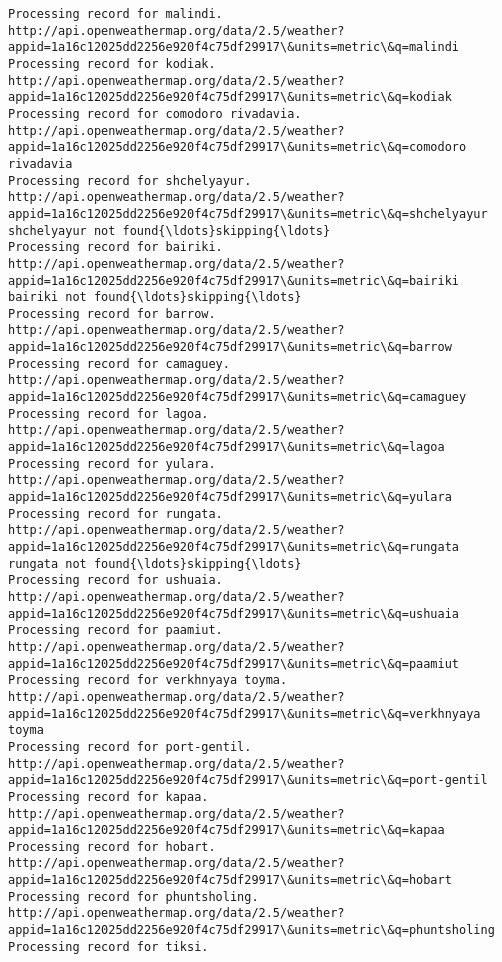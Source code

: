 \documentclass[11pt]{article}
\begin{document}
\begin{Verbatim}[commandchars=\\\{\}]
Processing record for malindi.
http://api.openweathermap.org/data/2.5/weather?appid=1a16c12025dd2256e920f4c75df29917\&units=metric\&q=malindi
Processing record for kodiak.
http://api.openweathermap.org/data/2.5/weather?appid=1a16c12025dd2256e920f4c75df29917\&units=metric\&q=kodiak
Processing record for comodoro rivadavia.
http://api.openweathermap.org/data/2.5/weather?appid=1a16c12025dd2256e920f4c75df29917\&units=metric\&q=comodoro rivadavia
Processing record for shchelyayur.
http://api.openweathermap.org/data/2.5/weather?appid=1a16c12025dd2256e920f4c75df29917\&units=metric\&q=shchelyayur
shchelyayur not found{\ldots}skipping{\ldots}
Processing record for bairiki.
http://api.openweathermap.org/data/2.5/weather?appid=1a16c12025dd2256e920f4c75df29917\&units=metric\&q=bairiki
bairiki not found{\ldots}skipping{\ldots}
Processing record for barrow.
http://api.openweathermap.org/data/2.5/weather?appid=1a16c12025dd2256e920f4c75df29917\&units=metric\&q=barrow
Processing record for camaguey.
http://api.openweathermap.org/data/2.5/weather?appid=1a16c12025dd2256e920f4c75df29917\&units=metric\&q=camaguey
Processing record for lagoa.
http://api.openweathermap.org/data/2.5/weather?appid=1a16c12025dd2256e920f4c75df29917\&units=metric\&q=lagoa
Processing record for yulara.
http://api.openweathermap.org/data/2.5/weather?appid=1a16c12025dd2256e920f4c75df29917\&units=metric\&q=yulara
Processing record for rungata.
http://api.openweathermap.org/data/2.5/weather?appid=1a16c12025dd2256e920f4c75df29917\&units=metric\&q=rungata
rungata not found{\ldots}skipping{\ldots}
Processing record for ushuaia.
http://api.openweathermap.org/data/2.5/weather?appid=1a16c12025dd2256e920f4c75df29917\&units=metric\&q=ushuaia
Processing record for paamiut.
http://api.openweathermap.org/data/2.5/weather?appid=1a16c12025dd2256e920f4c75df29917\&units=metric\&q=paamiut
Processing record for verkhnyaya toyma.
http://api.openweathermap.org/data/2.5/weather?appid=1a16c12025dd2256e920f4c75df29917\&units=metric\&q=verkhnyaya toyma
Processing record for port-gentil.
http://api.openweathermap.org/data/2.5/weather?appid=1a16c12025dd2256e920f4c75df29917\&units=metric\&q=port-gentil
Processing record for kapaa.
http://api.openweathermap.org/data/2.5/weather?appid=1a16c12025dd2256e920f4c75df29917\&units=metric\&q=kapaa
Processing record for hobart.
http://api.openweathermap.org/data/2.5/weather?appid=1a16c12025dd2256e920f4c75df29917\&units=metric\&q=hobart
Processing record for phuntsholing.
http://api.openweathermap.org/data/2.5/weather?appid=1a16c12025dd2256e920f4c75df29917\&units=metric\&q=phuntsholing
Processing record for tiksi.

\end{Verbatim}
\end{document}
